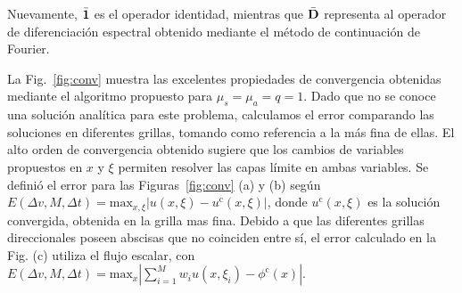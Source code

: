  Nuevamente, 
$\bar{\mathbf{1}}$ es  el operador identidad, mientras que $\bar{\mathbf{D}}$ representa al operador 
de diferenciación espectral obtenido mediante el método de continuación de Fourier. 

La Fig.~\ref{fig:conv} muestra las excelentes propiedades de convergencia 
obtenidas mediante el algoritmo propuesto para $\mu_s=\mu_a=q=1$. Dado 
que no se conoce una solución analítica para este problema, calculamos 
el error comparando las soluciones en diferentes grillas, tomando 
como referencia a la más fina de ellas. El alto orden 
de convergencia obtenido sugiere que los cambios de variables 
propuestos en $x$ y $\xi$ permiten 
resolver las capas límite en ambas variables. 
Se definió el error para las Figuras~\eqref{fig:conv} (a) y (b) según
  $E(\Delta v, M,\Delta t)=\text{max}_{x,\xi}
    |u(x,\xi)-u^{\text{c}}(x,\xi)|$, donde $u^{\text{c}}(x,\xi)$ 
    es la solución convergida, obtenida en la grilla mas fina. 
Debido a que las diferentes 
    grillas direccionales poseen abscisas que no coinciden 
    entre sí,  
    el error calculado en la Fig. (c) utiliza el flujo escalar, con  
$E(\Delta v, M,\Delta t)=\text{max}_x |\sum_{i=1}^M w_i u(x,\xi_i)-\phi^{\text{c}}(x)|$.

